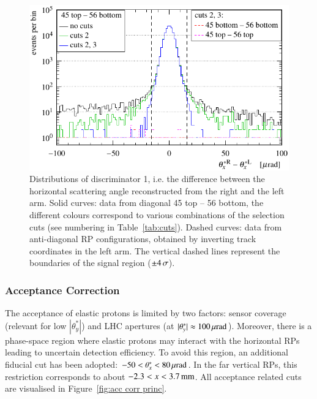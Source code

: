 \begin{figure}
\begin{center}
\includegraphics{fig/cut_distributions.pdf}
\caption{%
Distributions of discriminator 1, i.e. the difference between the horizontal scattering angle reconstructed from the right and the left arm. Solid curves: data from diagonal 45 top -- 56 bottom, the different colours correspond to various combinations of the selection cuts (see numbering in Table~\ref{tab:cuts}). Dashed curves: data from anti-diagonal RP configurations, obtained by inverting track coordinates in the left arm. The vertical dashed lines represent the boundaries of the signal region ($\pm 4\,{\rm \sigma}$).
}
\label{fig:tag bckg}
\end{center}
\end{figure}


\subsubsection{Acceptance Correction}
\label{sec:acc corr}

The acceptance of elastic protons is limited by two factors: sensor coverage (relevant for low $|\theta^*_y|$) and LHC apertures (at $|\theta^*_y| \approx 100\,{\rm \mu rad}$). Moreover, there is a phase-space region where elastic protons may interact with the horizontal RPs leading to uncertain detection efficiency. To avoid this region, an additional fiducial cut has been adopted: $-50 < \theta_x^* < 80\,{\rm \mu rad}$. In the far vertical RPs, this restriction corresponds to about $-2.3 < x < 3.7\,{\rm mm}$. All acceptance related cuts are visualised in Figure~\ref{fig:acc corr princ}.

